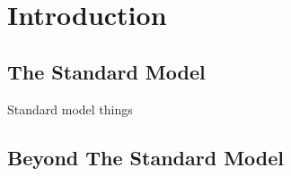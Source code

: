 \chapter{Introduction\label{ch:intro}}

\section{The Standard Model\label{sec:SM}}

Standard model things \cite{dalton}


\section{Beyond The Standard Model} 



